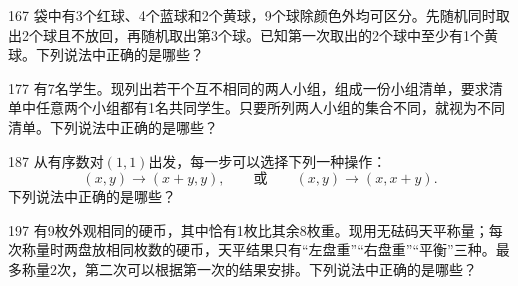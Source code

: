 
\begin{question}{16}{7}
袋中有3个红球、4个蓝球和2个黄球，9个球除颜色外均可区分。先随机同时取出2个球且不放回，再随机取出第3个球。已知第一次取出的2个球中至少有1个黄球。下列说法中正确的是哪些？
\begin{multichoices}
\end{multichoices}
\end{question}

\begin{question}{17}{7}
有7名学生。现列出若干个互不相同的两人小组，组成一份小组清单，要求清单中任意两个小组都有1名共同学生。只要所列两人小组的集合不同，就视为不同清单。下列说法中正确的是哪些？
\begin{multichoices}
\end{multichoices}
\end{question}

\begin{question}{18}{7}
从有序数对\((1,1)\)出发，每一步可以选择下列一种操作：
\[
  (x,y)\longrightarrow(x+y,y),
  \qquad\text{或}\qquad
  (x,y)\longrightarrow(x,x+y).
\]
下列说法中正确的是哪些？
\begin{multichoices}
\end{multichoices}
\end{question}

\begin{question}{19}{7}
有9枚外观相同的硬币，其中恰有1枚比其余8枚重。现用无砝码天平称量；每次称量时两盘放相同枚数的硬币，天平结果只有“左盘重”“右盘重”“平衡”三种。最多称量2次，第二次可以根据第一次的结果安排。下列说法中正确的是哪些？
\begin{multichoices}
\end{multichoices}
\end{question}

